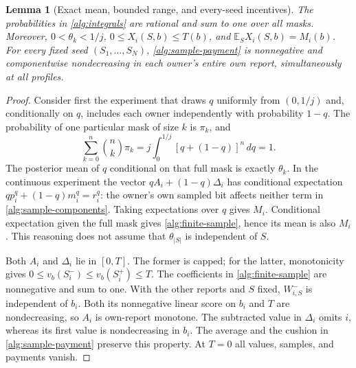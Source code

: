 \documentclass[11pt]{article}
\newtheorem{lemma}[theorem]{Lemma}
\theoremstyle{definition}\newtheorem{definition}[theorem]{Definition}
\theoremstyle{remark}\newtheorem{remark}[theorem]{Remark}
\newcommand{\E}{\mathbb E}
\begin{document}
\begin{lemma}[Exact mean, bounded range, and every-seed incentives]
\label{alg:finite-law}
The probabilities in \eqref{alg:integrals} are rational and sum to one over
all masks.  Moreover, $0<\theta_k<1/j$, $0\le X_i(S,b)\le T(b)$, and
$\E_S X_i(S,b)=M_i(b)$.  For every fixed seed $(S_1,\ldots,S_N)$,
\eqref{alg:sample-payment} is nonnegative and componentwise nondecreasing
in each owner's entire own report, simultaneously at all profiles.
\end{lemma}
\begin{proof}
Consider first the experiment that draws $q$ uniformly from $(0,1/j)$ and,
conditionally on $q$, includes each owner independently with probability
$1-q$.  The probability of one particular mask of size $k$ is $\pi_k$,
and
\[
 \sum_{k=0}^n\binom nk\pi_k
 =j\int_0^{1/j}[q+(1-q)]^n\,dq=1.
\]
The posterior mean of $q$ conditional on that full mask is exactly
$\theta_k$.  In the continuous experiment the vector
$qA_i+(1-q)\Delta_i$ has conditional expectation
$q p_i^q+(1-q)m_i^q=r_i^q$: the owner's own sampled bit affects neither
term in \eqref{alg:sample-components}.  Taking expectations over $q$ gives
$M_i$.  Conditional expectation given the full mask gives
\eqref{alg:finite-sample}, hence its mean is also $M_i$.
This reasoning does not assume that $\theta_{|S|}$ is independent of $S$.

Both $A_i$ and $\Delta_i$ lie in $[0,T]$.  The former is capped; for the
latter, monotonicity gives $0\le v_b(S_i^- )\le v_b(S_i^+)\le T$.
The coefficients in \eqref{alg:finite-sample} are nonnegative and sum to one.
With the other reports and $S$ fixed, $W^-_{i,S}$ is independent of $b_i$.
Both its nonnegative linear score on $b_i$ and $T$ are nondecreasing, so
$A_i$ is own-report monotone.  The subtracted value in $\Delta_i$ omits $i$,
whereas its first value is nondecreasing in $b_i$.  The average and the
cushion in \eqref{alg:sample-payment} preserve this property.
At $T=0$ all values, samples, and payments vanish.
\end{proof}
\end{document}

